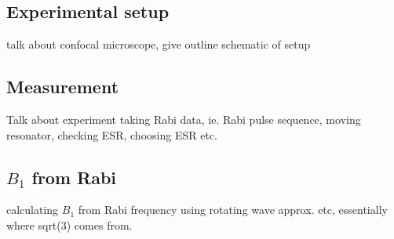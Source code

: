 \subsection{Experimental setup}

talk about confocal microscope, give outline schematic of setup

\subsection{Measurement}

Talk about experiment taking Rabi data, ie. Rabi pulse sequence, moving resonator, checking ESR, choosing ESR etc.

\subsection{$B_1$ from Rabi}

calculating $B_1$ from Rabi frequency using rotating wave approx. etc, essentially where sqrt(3) comes from.




